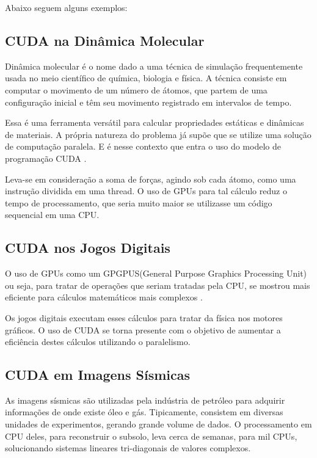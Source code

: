 \documentclass[12pt]{article}
\begin{document}
Abaixo seguem alguns exemplos:
\subsection{CUDA na Dinâmica Molecular}
Dinâmica molecular é o nome dado a uma técnica de simulação frequentemente usada no meio científico de química, biologia e física. A técnica consiste em computar o movimento de um número de átomos, que partem de uma configuração inicial e têm seu movimento registrado em intervalos de tempo. 

Essa é uma ferramenta versátil para calcular propriedades estáticas e dinâmicas de materiais. A própria natureza do problema já supõe que se utilize uma solução de computação paralela. E é nesse contexto que entra o uso do modelo de programação CUDA \cite{CUDAartigo1}.

Leva-se em consideração a soma de forças, agindo sob cada átomo, como uma instrução dividida em uma thread. O uso de GPUs para tal cálculo reduz o tempo de processamento, que seria muito maior se utilizasse um código sequencial em uma CPU.
\subsection{CUDA nos Jogos Digitais}
O uso de GPUs como um GPGPUS(General Purpose Graphics Processing Unit) ou seja, para tratar de operações que seriam tratadas pela CPU, se mostrou mais eficiente para cálculos matemáticos mais complexos \cite{tom}.

Os jogos digitais executam esses cálculos para tratar da física nos motores gráficos. O uso de CUDA se torna presente com o objetivo de aumentar a eficiência destes cálculos utilizando o paralelismo.
\subsection{CUDA em Imagens Sísmicas}
As imagens sísmicas são utilizadas pela indústria de petróleo para adquirir informações de onde existe óleo e gás. Tipicamente, consistem em diversas unidades de experimentos, gerando grande volume de dados. O processamento em CPU deles, para reconstruir o subsolo, leva cerca de semanas, para mil CPUs, solucionando sistemas lineares tri-diagonais de valores complexos.
\end{document}

